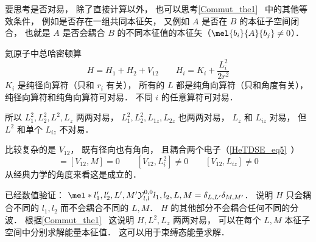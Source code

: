 
要思考是否对易， 除了直接计算以外， 也可以思考\autoref{Commut_the1}~ 中的其他等效条件， 例如是否存在一组共同本征矢， 又例如 $A$ 是否在 $B$ 的本征子空间闭合， 也就是 $A$ 是否会耦合 $B$ 的不同本征值的本征矢（$\mel{b_i}{A}{b_j} \ne 0$）．

氦原子中总哈密顿算
\begin{equation}
H = H_1 + H_2 + V_{12} \qquad H_i = K_i + \frac{L_i^2}{2r^2}
\end{equation}
$K_i$ 是纯径向算符（只和 $r_i$ 有关）， 所有的 $L$ 都是纯角向算符（只和角度有关）， 纯径向算符和纯角向算符可对易． 不同 $i$ 的任意算符可对易．

所以 $L_1^2, L_2^2, L^2, L_z$ 两两对易， $L_1^2, L_2^2, L_{1z}, L_{2z}$ 也两两对易， $L_z$ 和 $L_{iz}$ 对易， 但 $L^2$ 和单个 $L_{iz}$ 不对易．

比较复杂的是 $V_{12}$， 既有径向也有角向， 且耦合两个电子（\autoref{HeTDSE_eq5}~）
\begin{equation}
[V_{12}, L^2] = [V_{12}, M] = 0
\qquad
[V_{12}, L_i^2] \ne 0
\qquad
[V_{12}, L_{iz}] \ne 0
\end{equation}
从经典力学的角度来看这是成立的．

已经数值验证： $\mel*{l'_1,l'_2,L',M'}{\mathcal Y_{l,l}^{0,0}}{l_1,l_2,L,M} = \delta_{L,L'}\delta_{M,M'}$． 说明 $H$ 只会耦合不同的 $l_1,l_2$ 而不会耦合不同的 $L,M$． $H$ 的其他部分不会耦合任何不同的分波． 根据\autoref{Commut_the1}~ 这说明 $H,L^2,L_z$ 两两对易， 可以在每个 $L,M$ 本征子空间中分别求解能量本征值． 这可以用于束缚态能量求解．
